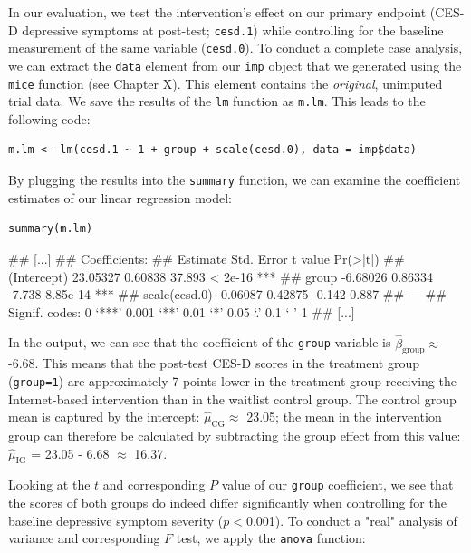 In our evaluation, we test the intervention's effect on our primary endpoint (CES-D depressive symptoms at post-test; \texttt{cesd.1}) while controlling for the baseline measurement of the same variable (\texttt{cesd.0}). To conduct a complete case analysis, we can extract the \texttt{data} element from our \texttt{imp} object that we generated using the \texttt{mice} function (see Chapter X). This element contains the \emph{original}, unimputed trial data. We save the results of the \texttt{lm} function as \texttt{m.lm}. This leads to the following code:

\begin{lstlisting}
m.lm <- lm(cesd.1 ~ 1 + group + scale(cesd.0), data = imp$data)
\end{lstlisting}

By plugging the results into the \texttt{summary} function, we can examine the coefficient estimates of our linear regression model:

\begin{lstlisting}
summary(m.lm)
\end{lstlisting}

\begin{example}
## [...]
## Coefficients:
##               Estimate Std. Error t value Pr(>|t|)    
## (Intercept)   23.05327    0.60838  37.893  < 2e-16 ***
## group         -6.68026    0.86334  -7.738 8.85e-14 ***
## scale(cesd.0) -0.06087    0.42875  -0.142    0.887    
## ---
## Signif. codes:  0 ‘***’ 0.001 ‘**’ 0.01 ‘*’ 0.05 ‘.’ 0.1 ‘ ’ 1
## [...]
\end{example}

In the output, we can see that the coefficient of the \texttt{group} variable is $\hat\beta_{\text{group}}\approx$-6.68. This means that the post-test CES-D scores in the treatment group (\texttt{group=1}) are approximately 7 points lower in the treatment group receiving the Internet-based intervention than in the waitlist control group. The control group mean is captured by the intercept: $\hat{\mu}_{\text{CG}}\approx$ 23.05; the mean in the intervention group can therefore be calculated by subtracting the group effect from this value: $\hat{\mu}_{\text{IG}}$ = 23.05 - 6.68 $\approx$ 16.37.

Looking at the $t$ and corresponding $P$ value of our \texttt{group} coefficient, we see that the scores of both groups do indeed differ significantly when controlling for the baseline depressive symptom severity ($p<$0.001). To conduct a "real" analysis of variance and corresponding $F$ test, we apply the \texttt{anova} function: 



